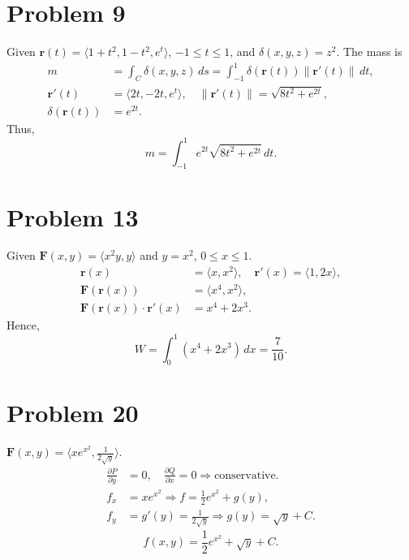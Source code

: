 \documentclass[12pt]{memoir}
\begin{document}
\section*{Problem 9}
Given $\mathbf{r}(t) = \langle 1 + t^2, 1 - t^2, e^t \rangle$, $-1 \le t \le 1$, and $\delta(x, y, z) = z^2$. The mass is
\begin{align*}
m &= \int_C \delta(x, y, z)\, ds = \int_{-1}^1 \delta(\mathbf{r}(t)) \|\mathbf{r}'(t)\|\, dt, \\
\mathbf{r}'(t) &= \langle 2t, -2t, e^t \rangle, \quad \|\mathbf{r}'(t)\| = \sqrt{8t^2 + e^{2t}}, \\
\delta(\mathbf{r}(t)) &= e^{2t}.
\end{align*}
Thus,
\begin{equation*}
m = \int_{-1}^1 e^{2t} \sqrt{8t^2 + e^{2t}}\, dt.
\end{equation*}

\section*{Problem 13}
Given $\mathbf{F}(x, y) = \langle x^2 y, y \rangle$ and $y = x^2$, $0 \le x \le 1$.  
\begin{align*}
\mathbf{r}(x) &= \langle x, x^2 \rangle, \quad \mathbf{r}'(x) = \langle 1, 2x \rangle, \\
\mathbf{F}(\mathbf{r}(x)) &= \langle x^4, x^2 \rangle, \\
\mathbf{F}(\mathbf{r}(x)) \cdot \mathbf{r}'(x) &= x^4 + 2x^3.
\end{align*}
Hence,
\begin{equation*}
W = \int_0^1 (x^4 + 2x^3)\, dx = \frac{7}{10}.
\end{equation*}

\section*{Problem 20}
$\mathbf{F}(x, y) = \langle x e^{x^2}, \tfrac{1}{2\sqrt{y}} \rangle$.  
\begin{align*}
\frac{\partial P}{\partial y} &= 0, \quad \frac{\partial Q}{\partial x} = 0 \Rightarrow \text{conservative.}\\
f_x &= x e^{x^2} \Rightarrow f = \frac{1}{2} e^{x^2} + g(y), \\
f_y &= g'(y) = \frac{1}{2\sqrt{y}} \Rightarrow g(y) = \sqrt{y} + C.
\end{align*}
\begin{equation*}
f(x, y) = \frac{1}{2} e^{x^2} + \sqrt{y} + C.
\end{equation*}
\end{document}
